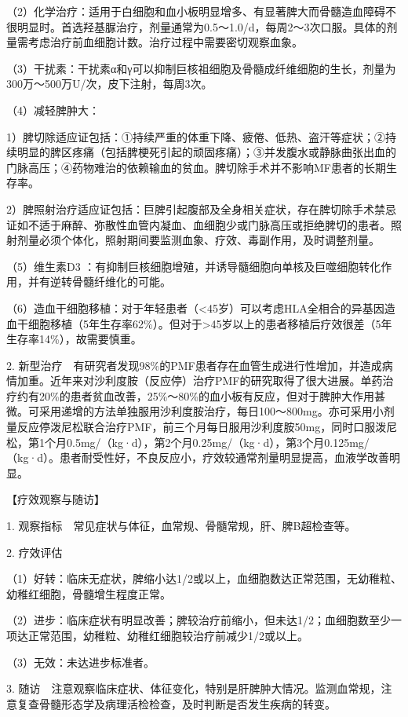 （2）化学治疗：适用于白细胞和血小板明显增多、有显著脾大而骨髓造血障碍不很明显时。首选羟基脲治疗，剂量通常为0.5～1.0/d，每周2～3次口服。具体的剂量需考虑治疗前血细胞计数。治疗过程中需要密切观察血象。

（3）干扰素：干扰素α和γ可以抑制巨核祖细胞及骨髓成纤维细胞的生长，剂量为300万～500万U/次，皮下注射，每周3次。

（4）减轻脾肿大：

1）脾切除适应证包括：①持续严重的体重下降、疲倦、低热、盗汗等症状；②持续明显的脾区疼痛（包括脾梗死引起的顽固疼痛）；③并发腹水或静脉曲张出血的门脉高压；④药物难治的依赖输血的贫血。脾切除手术并不影响MF患者的长期生存率。

2）脾照射治疗适应证包括：巨脾引起腹部及全身相关症状，存在脾切除手术禁忌证如不适于麻醉、弥散性血管内凝血、血细胞少或门脉高压或拒绝脾切的患者。照射剂量必须个体化，照射期间要监测血象、疗效、毒副作用，及时调整剂量。

（5）维生素D{3}
：有抑制巨核细胞增殖，并诱导髓细胞向单核及巨噬细胞转化作用，并有逆转骨髓纤维化的可能。

（6）造血干细胞移植：对于年轻患者（<45岁）可以考虑HLA全相合的异基因造血干细胞移植（5年生存率62\%）。但对于\textgreater{}45岁以上的患者移植后疗效很差（5年生存率14\%），故需要慎重。

2.
新型治疗　有研究者发现98\%的PMF患者存在血管生成进行性增加，并造成病情加重。近年来对沙利度胺（反应停）治疗PMF的研究取得了很大进展。单药治疗约有20\%的患者贫血改善，25\%～80\%的血小板有反应，但对于脾肿大作用甚微。可采用递增的方法单独服用沙利度胺治疗，每日100～800mg。亦可采用小剂量反应停泼尼松联合治疗PMF，前三个月每日服用沙利度胺50mg，同时口服泼尼松，第1个月0.5mg/（kg·d），第2个月0.25mg/（kg·d），第3个月0.125mg/（kg·d）。患者耐受性好，不良反应小，疗效较通常剂量明显提高，血液学改善明显。

【疗效观察与随访】

1. 观察指标　常见症状与体征，血常规、骨髓常规，肝、脾B超检查等。

2. 疗效评估

（1）好转：临床无症状，脾缩小达1/2或以上，血细胞数达正常范围，无幼稚粒、幼稚红细胞，骨髓增生程度正常。

（2）进步：临床症状有明显改善；脾较治疗前缩小，但未达1/2；血细胞数至少一项达正常范围，幼稚粒、幼稚红细胞较治疗前减少1/2或以上。

（3）无效：未达进步标准者。

3.
随访　注意观察临床症状、体征变化，特别是肝脾肿大情况。监测血常规，注意复查骨髓形态学及病理活检检查，及时判断是否发生疾病的转变。

